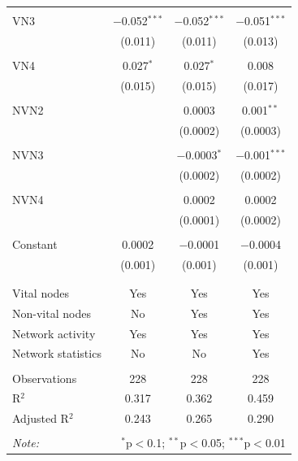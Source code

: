 \begin{table}[!htbp]
\begin{tabular}{@{\extracolsep{5pt}}lccc}
  & & & \\ 
 VN3 & $-$0.052$^{***}$ & $-$0.052$^{***}$ & $-$0.051$^{***}$ \\ 
  & (0.011) & (0.011) & (0.013) \\ 
  & & & \\ 
 VN4 & 0.027$^{*}$ & 0.027$^{*}$ & 0.008 \\ 
  & (0.015) & (0.015) & (0.017) \\ 
  & & & \\ 
 NVN2 &  & 0.0003 & 0.001$^{**}$ \\ 
  &  & (0.0002) & (0.0003) \\ 
  & & & \\ 
 NVN3 &  & $-$0.0003$^{*}$ & $-$0.001$^{***}$ \\ 
  &  & (0.0002) & (0.0002) \\ 
  & & & \\ 
 NVN4 &  & 0.0002 & 0.0002 \\ 
  &  & (0.0001) & (0.0002) \\ 
  & & & \\ 
 Constant & 0.0002 & $-$0.0001 & $-$0.0004 \\ 
  & (0.001) & (0.001) & (0.001) \\ 
  & & & \\ 
\hline \\[-1.8ex] 
Vital nodes & Yes & Yes & Yes \\ 
Non-vital nodes & No & Yes & Yes \\ 
Network activity & Yes & Yes & Yes \\ 
Network statistics & No & No & Yes \\ 
\hline &  &  &  \\ 
Observations & 228 & 228 & 228 \\ 
R$^{2}$ & 0.317 & 0.362 & 0.459 \\ 
Adjusted R$^{2}$ & 0.243 & 0.265 & 0.290 \\ 
\hline 
\hline \\[-1.8ex] 
\textit{Note:}  & \multicolumn{3}{r}{$^{*}$p$<$0.1; $^{**}$p$<$0.05; $^{***}$p$<$0.01} \\ 
\end{tabular} 
\end{table} 
